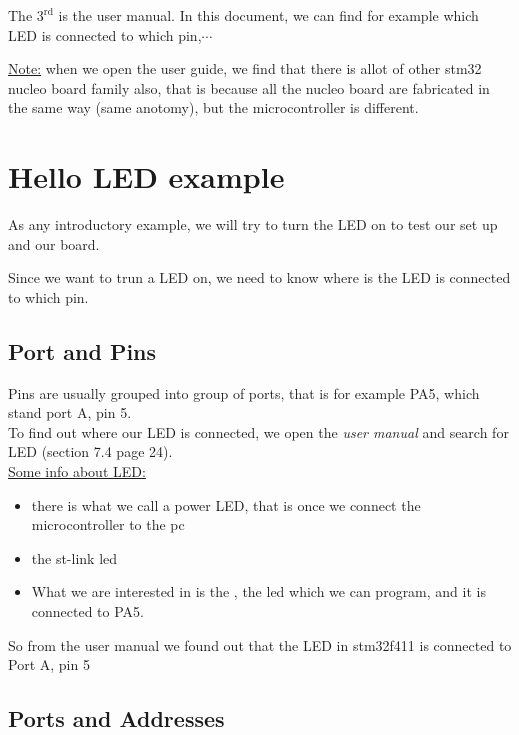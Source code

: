 \documentclass[12pt,a4paper]{book}
\begin{document}
The $\mathrm{3}^\mathrm{rd}$ is the user manual. In this document, we can find for example which LED is connected to which pin,$\cdots$


\underline{Note:} when we open the user guide, we find that there is allot of other stm32 nucleo board family also, that is because all the nucleo board are fabricated in the same way (same anotomy), but the microcontroller is different.


\section{Hello LED example}

As any introductory example, we will try to turn the LED on to test our set up and our board.

Since we want to trun a LED on, we need to know where is the LED is connected to which pin.

\subsection{Port and Pins}

Pins are usually grouped into group of ports, that is for example PA5, which stand port A, pin 5.\\

To find out where our LED is connected, we open the \textit{user manual} and search for LED (section 7.4 page 24).\\

\underline{Some info about LED:}

\begin{itemize}

\item there is what we call a power LED, that is once we connect the microcontroller to the pc

\item the st-link led

\item  What we are interested in is the , the led which we can program, and it is connected to PA5.

\end{itemize}

So from the user manual we found out that the LED in stm32f411 is connected to Port A, pin 5

\subsection{Ports and Addresses}
\end{document}
